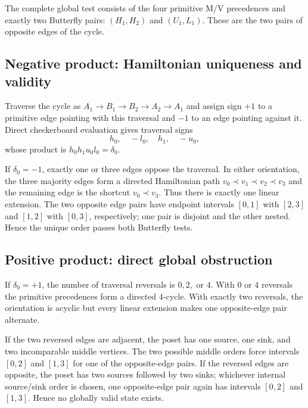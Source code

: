 \documentclass[11pt]{article}
\theoremstyle{definition}
\theoremstyle{remark}
\begin{document}
The complete global test consists of the four primitive M/V precedences
and exactly two Butterfly pairs: \((H_1,H_2)\) and \((U_1,L_1)\). These
are the two pairs of opposite edges of the cycle.

\subsection{Negative product: Hamiltonian uniqueness and
validity}\label{f.2.-negative-product-hamiltonian-uniqueness-and-validity}

Traverse the cycle as \(A_1\to B_1\to B_2\to A_2\to A_1\) and assign
sign \(+1\) to a primitive edge pointing with this traversal and \(-1\)
to an edge pointing against it. Direct checkerboard evaluation gives
traversal signs \[
h_0,\quad -l_0,\quad h_1,\quad -u_0,
\] whose product is \(h_0h_1u_0l_0=\delta_0\).

If \(\delta_0=-1\), exactly one or three edges oppose the traversal. In
either orientation, the three majority edges form a directed Hamiltonian
path \(v_0\prec v_1\prec v_2\prec v_3\) and the remaining edge is the
shortcut \(v_0\prec v_3\). Thus there is exactly one linear extension.
The two opposite edge pairs have endpoint intervals \([0,1]\) with
\([2,3]\) and \([1,2]\) with \([0,3]\), respectively; one pair is
disjoint and the other nested. Hence the unique order passes both
Butterfly tests.

\subsection{Positive product: direct global
obstruction}\label{f.3.-positive-product-direct-global-obstruction}

If \(\delta_0=+1\), the number of traversal reversals is \(0,2,\) or
\(4\). With \(0\) or \(4\) reversals the primitive precedences form a
directed \(4\)-cycle. With exactly two reversals, the orientation is
acyclic but every linear extension makes one opposite-edge pair
alternate.

If the two reversed edges are adjacent, the poset has one source, one
sink, and two incomparable middle vertices. The two possible middle
orders force intervals \([0,2]\) and \([1,3]\) for one of the
opposite-edge pairs. If the reversed edges are opposite, the poset has
two sources followed by two sinks; whichever internal source/sink order
is chosen, one opposite-edge pair again has intervals \([0,2]\) and
\([1,3]\). Hence no globally valid state exists.
\end{document}
